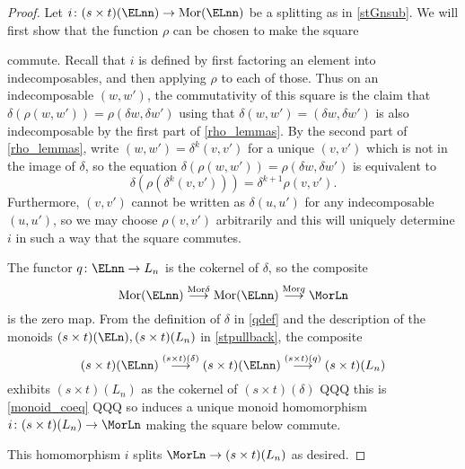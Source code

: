 \begin{proof}
Let $i \colon (s \times t)(\ELnn) \rightarrow \mathrm{Mor}(\ELnn)$ be a splitting as in \cref{stGnsub}. We will first show that the function $\rho$ can be chosen to make the square
\begin{center}
\end{center}
commute. Recall that $i$ is defined by first factoring an element into indecomposables, and then applying $\rho$ to each of those. Thus on an indecomposable $(w,w')$, the commutativity of this square is the claim that $\delta(\rho(w,w')) = \rho(\delta w, \delta w')$ using that $\delta(w,w') = (\delta w, \delta w')$ is also indecomposable by the first part of \cref{rho_lemmas}. By the second part of \cref{rho_lemmas}, write $(w,w') = \delta^k(v,v')$ for a unique $(v, v')$ which is not in the image of $\delta$, so the equation $\delta(\rho(w,w')) = \rho(\delta w, \delta w')$ is equivalent to
  \[
    \delta\left(\rho\left(\delta^k(v,v')\right)\right) = \delta^{k+1}\rho(v,v').
  \]
Furthermore, $(v,v')$ cannot be written as $\delta(u,u')$ for any indecomposable $(u,u')$, so we may choose $\rho(v,v')$ arbitrarily and this will uniquely determine $i$ in such a way that the square commutes. 

The functor $q \colon \ELnn \rightarrow L_n$ is the cokernel of $\delta$, so the composite
  \[
    \mathrm{Mor}(\ELnn) \stackrel{\mathrm{Mor}\delta}{\longrightarrow} \mathrm{Mor}(\ELnn) \stackrel{\mathrm{Mor}q}{\longrightarrow} \MorLn
  \]
is the zero map. From the definition of $\delta$ in \cref{qdef} and the description of the monoids $(s \times t)(\ELn), (s \times t)(L_n)$ in \cref{stpullback}, the composite
  \[
    (s \times t)(\ELnn) \stackrel{(s \times t)(\delta)}{\longrightarrow}  (s \times t)(\ELnn) \stackrel{(s \times t)(q)}{\longrightarrow} (s \times t)(L_n)
  \]
exhibits $(s \times t)(L_n)$ as the cokernel of $(s \times t)(\delta)$ QQQ this is \cref{monoid_coeq} QQQ so induces a unique monoid homomorphism $i \colon  (s \times t)(L_n) \rightarrow \MorLn$ making the square below commute.
\begin{center}
\end{center}
This homomorphism $i$ splits $\MorLn \rightarrow (s \times t)(L_n)$ as desired.


\end{proof}
